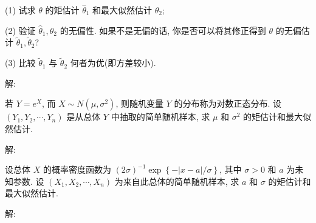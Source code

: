 \documentclass[standard]{ExBook}
\begin{document}
\begin{qitems}
\begin{bbox}
\begin{shaded}
(1) 试求 \( \theta \) 的矩估计 \( \hat{\theta}_1 \) 和最大似然估计 \( \hat{\theta}_2 \);

(2) 验证 \( \hat{\theta}_1, \hat{\theta}_2 \) 的无偏性. 如果不是无偏的话, 你是否可以将其修正得到 \( \theta \) 的无偏估计 \( \tilde{\theta}_1, \tilde{\theta}_2 \)? 

(3) 比较 \( \tilde{\theta}_1 \) 与 \( \tilde{\theta}_2 \) 何者为优(即方差较小).
    \end{shaded}
    \end{bbox}

\vspace{-5em}

    \begin{bbox}
解: 
    \end{bbox}

\vspace{-5em}

    \begin{bbox}
    \begin{shaded}
        \qitem
若 \( Y = e^X \), 而 \( X \sim N(\mu, \sigma^2) \), 则随机变量 \( Y \) 的分布称为对数正态分布. 设 \( (Y_1, Y_2, \cdots, Y_n) \) 是从总体 \( Y \) 中抽取的简单随机样本, 求 \( \mu \) 和 \( \sigma^2 \) 的矩估计和最大似然估计.
    \end{shaded}
    \end{bbox}

\vspace{-5em}

    \begin{bbox}
解: 
    \end{bbox}

\vspace{-5em}

    \begin{bbox}
    \begin{shaded}
        \qitem
设总体 \( X \) 的概率密度函数为 \( (2\sigma)^{-1} \exp\left\{ -|x-a| \big/ \sigma \right\} \), 其中 \( \sigma > 0 \) 和 \( a \) 为未知参数. 设 \( (X_1, X_2, \cdots, X_n) \) 为来自此总体的简单随机样本, 求 \( a \) 和 \( \sigma \) 的矩估计和最大似然估计.
    \end{shaded}
    \end{bbox}

\vspace{-5em}

    \begin{bbox}
解: 
    \end{bbox}

\vspace{-5em}


\end{qitems}
\end{document}
